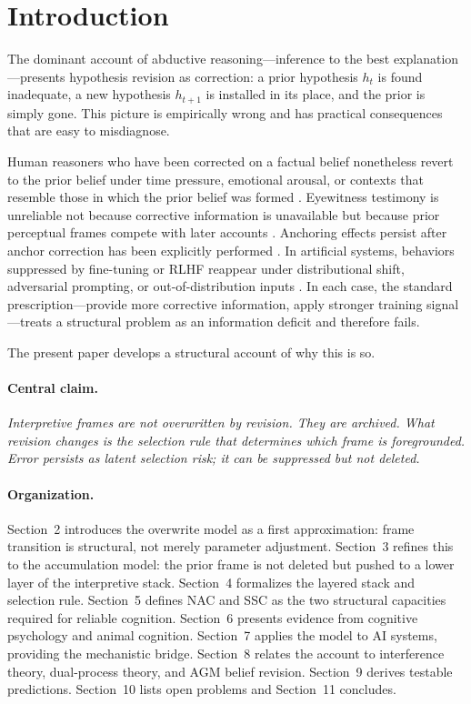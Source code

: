 \documentclass[12pt]{article}
\begin{document}
\tableofcontents

\section{Introduction}

The dominant account of abductive reasoning---inference to the best
explanation \cite{harman1965}---presents hypothesis revision as
correction: a prior hypothesis $h_t$ is found inadequate, a new
hypothesis $h_{t+1}$ is installed in its place, and the prior is
simply gone.
This picture is empirically wrong and has practical consequences
that are easy to misdiagnose.

Human reasoners who have been corrected on a factual belief
nonetheless revert to the prior belief under time pressure, emotional
arousal, or contexts that resemble those in which the prior belief
was formed \cite{ecker2022}.
Eyewitness testimony is unreliable not because corrective information
is unavailable but because prior perceptual frames compete with later
accounts \cite{loftus1979}.
Anchoring effects persist after anchor correction has been explicitly
performed \cite{epley2001}.
In artificial systems, behaviors suppressed by fine-tuning or RLHF
reappear under distributional shift, adversarial prompting, or
out-of-distribution inputs \cite{wei2023jailbroken, qi2023fine}.
In each case, the standard prescription---provide more corrective
information, apply stronger training signal---treats a structural
problem as an information deficit and therefore fails.

The present paper develops a structural account of why this is so.

\paragraph{Central claim.}
\emph{Interpretive frames are not overwritten by revision.
They are archived.
What revision changes is the selection rule that determines
which frame is foregrounded.
Error persists as latent selection risk; it can be suppressed
but not deleted.}

\paragraph{Organization.}
Section~2 introduces the overwrite model as a first approximation:
frame transition is structural, not merely parameter adjustment.
Section~3 refines this to the accumulation model: the prior frame
is not deleted but pushed to a lower layer of the interpretive stack.
Section~4 formalizes the layered stack and selection rule.
Section~5 defines NAC and SSC as the two structural capacities
required for reliable cognition.
Section~6 presents evidence from cognitive psychology and animal
cognition.
Section~7 applies the model to AI systems, providing the mechanistic
bridge.
Section~8 relates the account to interference theory, dual-process
theory, and AGM belief revision.
Section~9 derives testable predictions.
Section~10 lists open problems and Section~11 concludes.
\end{document}
